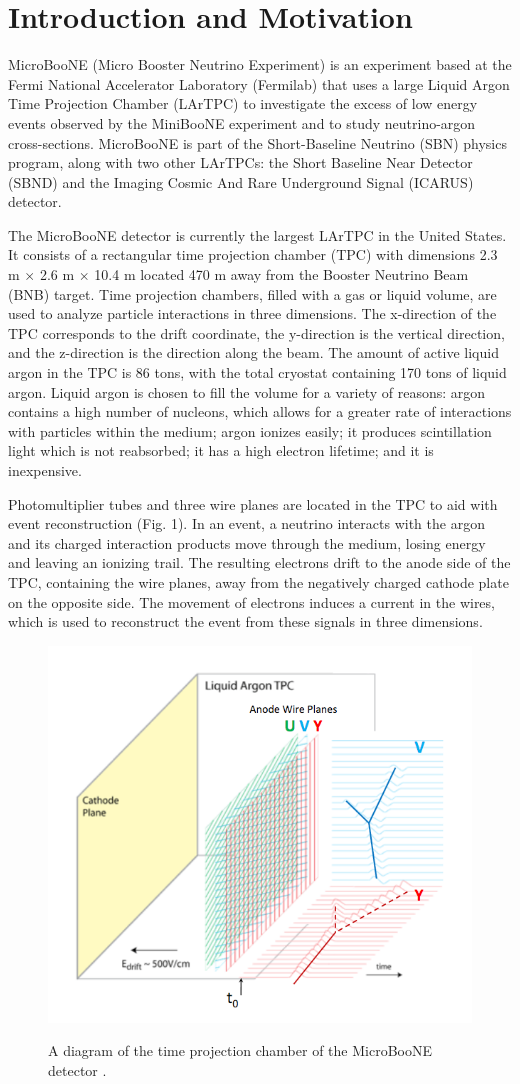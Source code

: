 \section{Introduction and Motivation}

MicroBooNE (Micro Booster Neutrino Experiment) is an experiment based at the Fermi National Accelerator Laboratory (Fermilab) that uses a large Liquid Argon Time Projection Chamber (LArTPC) to investigate the excess of low energy events observed by the MiniBooNE experiment \cite{Aguilar-Arevalo:2013pmq} and to study neutrino-argon cross-sections. MicroBooNE is part of the Short-Baseline Neutrino (SBN) physics program, along with two other LArTPCs: the Short Baseline Near Detector (SBND) and the Imaging Cosmic And Rare Underground Signal (ICARUS) detector. 

The MicroBooNE detector is currently the largest LArTPC in the United States. It consists of a rectangular time projection chamber (TPC) with dimensions 2.3 m $\times$ 2.6 m $\times$ 10.4 m located 470 m away from the Booster Neutrino Beam (BNB) target. Time projection chambers, filled with a gas or liquid volume, are used to analyze particle interactions in three dimensions. The x-direction of the TPC corresponds to the drift coordinate, the y-direction is the vertical direction, and the z-direction is the direction along the beam. The amount of active liquid argon in the TPC is 86 tons, with the total cryostat containing 170 tons of liquid argon. Liquid argon is chosen to fill the volume for a variety of reasons: argon contains a high number of nucleons, which allows for a greater rate of interactions with particles within the medium; argon ionizes easily; it produces scintillation light which is not reabsorbed; it has a high electron lifetime; and it is inexpensive.

Photomultiplier tubes and three wire planes are located in the TPC to aid with event reconstruction (Fig. 1). In an event, a neutrino interacts with the argon and its charged interaction products move through the medium, losing energy and leaving an ionizing trail. The resulting electrons drift to the anode side of the TPC, containing the wire planes, away from the negatively charged cathode plate on the opposite side. The movement of electrons induces a current in the wires, which is used to reconstruct the event from these signals in three dimensions.

\begin{figure}[h!]
\centering
	\includegraphics[width=0.4\linewidth]{Figures/detector2.png} \\
\caption{A diagram of the time projection chamber of the MicroBooNE detector \cite{lartpc}.}
\end{figure}

